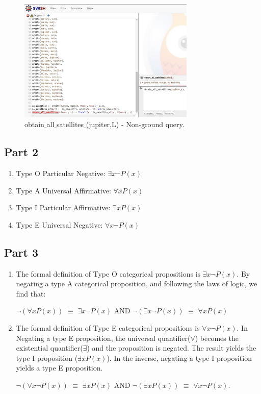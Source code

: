 \documentclass[12pt]{article}
\begin{document}
\begin{enumerate}
	\begin{figure}[htbp]
		\centering
		\includegraphics[width=0.75\textwidth]{obtain-all-satellites_NG.JPG}
		\caption{obtain$\_$all$\_$satellites$\_$(jupiter,L) - Non-ground query.}
	\end{figure}
	
\end{enumerate}
\newpage
\newpage
\subsection*{Part 2}

\begin{enumerate}
	\item Type O Particular Negative: $\exists x \neg P(x)$
	
	\item Type A Universal Affirmative: $\forall x P(x)$
	
	\item Type I Particular Affirmative: $\exists x P(x)$
	
	\item Type E Universal Negative: $\forall x \neg P(x)$
\end{enumerate}
\subsection*{Part 3}

\begin{enumerate}
	
	\item The formal definition of Type O categorical propositions is $\exists x \neg P(x)$.
	By negating a type A categorical proposition, and following the laws of logic, we find that:
	
	$\neg (\forall x P(x))$ $\equiv$ $\exists x \neg P(x)$ AND 
	$\neg (\exists x \neg P(x))$ $\equiv$ $\forall x P(x)$
	
	\item The formal definition of Type E categorical propositions is $\forall x \neg P(x)$. In Negating a type E proposition, the universal quantifier($\forall $) becomes the existential quantifier($\exists$) and the proposition is negated. The result yields the type I proposition ($\exists x P(x)$). In the inverse, negating a type I proposition yields a type E proposition.
	
	$\neg (\forall x \neg P(x))$ $\equiv$ $\exists x P(x)$ AND $\neg (\exists x P(x))$ $\equiv$ $\forall x \neg P(x)$.
	\end{enumerate}
\newpage
\end{document}
